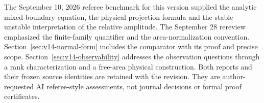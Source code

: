 The September 10, 2026 referee benchmark for this version supplied the
analytic mixed-boundary equation, the physical projection formula and
the stable--unstable interpretation of the relative amplitude. The
September 28 rereview emphasized the finite-family quantifier and the
area-normalization convention. Section~\ref{sec:v14-normal-form}
includes the comparator with its proof and precise scope.
Section~\ref{sec:v14-observability} addresses the observation questions
through a rank characterization and a free-area physical construction.
Both reports and their frozen source identities are retained with the
revision. They are author-requested AI referee-style assessments, not
journal decisions or formal proof certificates.

